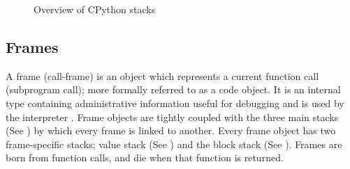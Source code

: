 {\begin{figure}

				\caption{Overview of CPython stacks}
				\label{fig:stacks_overview}
			\end{figure}

		\pagebreak

		\subsection{Frames}
		\label{subsec:frames}
		\par A frame (call-frame) is an object which represents a current function call (subprogram call); more formally referred to as a code object. It is an internal type containing administrative information useful for debugging and is used
		by the interpreter \cite[pp.18--19]{van1994python}. Frame objects are tightly coupled with the three main stacks (See {\bfseries{}}) by which every frame is linked to another. Every frame object has two frame-specific stacks;
		value stack (See {\bfseries{}}) and the block stack (See {\bfseries{}}). Frames are born from function calls, and die when that function is returned.
		
}
